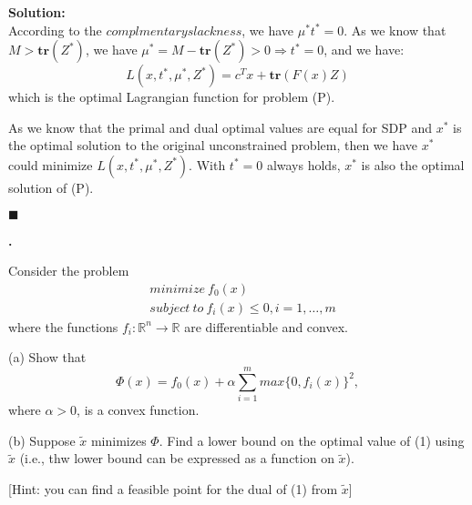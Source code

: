 \documentclass{article}
\newcounter{pcounter}                                   %
\newenvironment{problem}                                %
{                                                       %
    \stepcounter{pcounter}                              %
    \textbf{\arabic{pcounter}.}                         %
}{}                                                     %
\newenvironment{solution}                               %
{\textbf{Solution:} \\}{$\blacksquare$\newline}         %
\newcommand{\leadto}{\Rightarrow}                       %
\newcommand{\domR}{\mathbb{R}}                          %
\newcommand{\tr}[1]{\textbf{tr}(#1)}                    %
\begin{document}
\begin{solution}
    According to the $complmentary slackness$, we have $\mu^* t^* = 0$.
    As we know that $M > \tr{Z^*}$, we have $\mu^* = M - \tr{Z^*} > 0 \leadto t^* = 0$, and we have:
    \[
        L(x, t^*, \mu^*, Z^*) = c^T x + \tr{F(x)Z}
    \]
    which is the optimal Lagrangian function for problem (P).

    As we know that the primal and dual optimal values are equal for SDP and $x^*$ is the optimal solution to the original unconstrained problem, then we have $x^*$ could minimize $L(x, t^*, \mu^*, Z^*)$. With $t^* = 0$ always holds, $x^*$ is also the optimal solution of (P).

\end{solution}

\begin{problem}
    Consider the problem
    \begin{align}
        &minimize\ f_0(x) \\
        &subject\ to\ f_i(x) \leq 0, i=1,\dots,m \nonumber
    \end{align}
    where the functions $f_i:\domR^n \rightarrow \domR$ are differentiable and convex.

    (a) Show that
    \[
        \Phi(x) = f_0(x) + \alpha \sum_{i=1}^m max\{0,f_i(x)\}^2,
    \]
    where $\alpha > 0$, is a convex function.

    (b) Suppose $\tilde{x}$ minimizes $\Phi$. Find a lower bound on the optimal value of (1) using $\tilde{x}$ (i.e., thw lower bound can be expressed as a function on $\tilde{x}$).

    [Hint: you can find a feasible point for the dual of (1) from $\tilde{x}$]
\end{problem}
\end{document}
